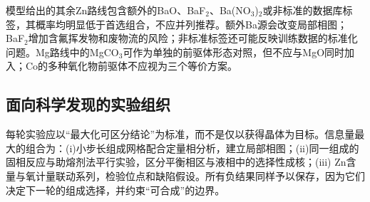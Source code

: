 模型给出的其余Zn路线包含额外的BaO、BaF$_2$、Ba(NO$_3$)$_2$或非标准的数据库标签，其概率均明显低于首选组合，不应并列推荐。额外Ba源会改变局部相图；BaF$_2$增加含氟挥发物和废物流的风险；非标准标签还可能反映训练数据的标准化问题。Mg路线中的MgCO$_3$可作为单独的前驱体形态对照，但不应与MgO同时加入；Co的多种氧化物前驱体不应视为三个等价方案。

\subsection{面向科学发现的实验组织}

每轮实验应以“最大化可区分结论”为标准，而不是仅以获得晶体为目标。信息量最大的组合为：(i)小步长组成网格配合定量相分析，建立局部相图；(ii)同一组成的固相反应与助熔剂法平行实验，区分平衡相区与液相中的选择性成核；(iii) Zn含量与氧计量联动系列，检验位点和缺陷假设。所有负结果同样予以保存，因为它们决定下一轮的组成选择，并约束“可合成”的边界。
